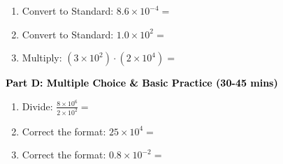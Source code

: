 \documentclass[12pt, letterpaper, fleqn]{article}
\newcommand{\blank}{\underline{\hspace{2.2cm}}}
\begin{document}
\begin{enumerate}[itemsep=2.5cm, leftmargin=0.6cm, resume]
\item Convert to Standard: $8.6 \times 10^{-4} =$ \blank
\item Convert to Standard: $1.0 \times 10^2 =$ \blank
\item Multiply: $(3 \times 10^2) \cdot (2 \times 10^4) =$ \blank
\end{enumerate}

\newpage

\begin{tcolorbox}[colback=customteal!20]
\large\textcolor{black}{\textbf{Part D: Multiple Choice \& Basic Practice (30-45 mins)}}
\end{tcolorbox}

\vspace{3mm}

\begin{enumerate}[itemsep=2.5cm, leftmargin=0.6cm, resume]
\item Divide: $\frac{8 \times 10^6}{2 \times 10^2} =$ \blank
\item Correct the format: $25 \times 10^4 = $ \blank
\item Correct the format: $0.8 \times 10^{-2} = $ \blank
\end{enumerate}
\end{document}
